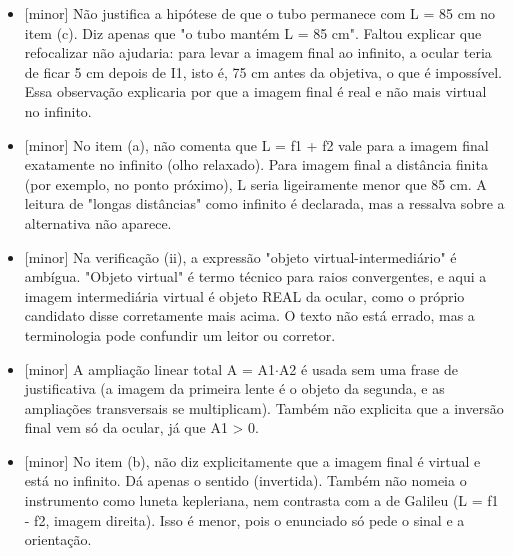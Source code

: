 \documentclass{article}%
\begin{document}
\begin{itemize}%
\item%
{[}minor{]} Não justifica a hipótese de que o tubo permanece com L = 85 cm no item (c). Diz apenas que "o tubo mantém L = 85 cm". Faltou explicar que refocalizar não ajudaria: para levar a imagem final ao infinito, a ocular teria de ficar 5 cm depois de I1, isto é, 75 cm antes da objetiva, o que é impossível. Essa observação explicaria por que a imagem final é real e não mais virtual no infinito.%
\item%
{[}minor{]} No item (a), não comenta que L = f1 + f2 vale para a imagem final exatamente no infinito (olho relaxado). Para imagem final a distância finita (por exemplo, no ponto próximo), L seria ligeiramente menor que 85 cm. A leitura de "longas distâncias" como infinito é declarada, mas a ressalva sobre a alternativa não aparece.%
\item%
{[}minor{]} Na verificação (ii), a expressão "objeto virtual{-}intermediário" é ambígua. "Objeto virtual" é termo técnico para raios convergentes, e aqui a imagem intermediária virtual é objeto REAL da ocular, como o próprio candidato disse corretamente mais acima. O texto não está errado, mas a terminologia pode confundir um leitor ou corretor.%
\item%
{[}minor{]} A ampliação linear total A = A1$\cdot$A2 é usada sem uma frase de justificativa (a imagem da primeira lente é o objeto da segunda, e as ampliações transversais se multiplicam). Também não explicita que a inversão final vem só da ocular, já que A1 > 0.%
\item%
{[}minor{]} No item (b), não diz explicitamente que a imagem final é virtual e está no infinito. Dá apenas o sentido (invertida). Também não nomeia o instrumento como luneta kepleriana, nem contrasta com a de Galileu (L = f1 - f2, imagem direita). Isso é menor, pois o enunciado só pede o sinal e a orientação.%
\end{itemize}%
\end{document}
